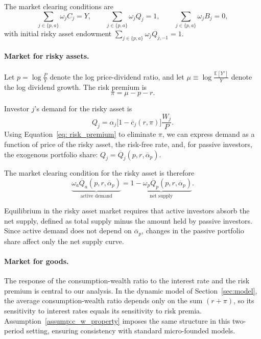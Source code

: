 The market clearing conditions are
\[
    \sum_{j\in\{p,a\}} \omega_j C_j = Y, \qquad
    \sum_{j\in\{p,a\}} \omega_j Q_j = 1, \qquad
    \sum_{j\in\{p,a\}} \omega_j B_j = 0,
\]
with initial risky asset endowment $\sum_{j\in\{p,a\}} \omega_j Q_{j,-1} = 1$.

\paragraph{Market for risky assets.}
Let $p = \log \frac{P}{Y}$ denote the log price-dividend ratio, and let $\mu \equiv \log \frac{\mathbb{E}[Y']}{Y}$ denote the log dividend growth.
The risk premium is
\begin{equation}\label{eq: risk_premium}
    \pi = \mu - p - r.
\end{equation}

Investor $j$'s demand for the risky asset is
\[
    Q_j = \alpha_j \bigl[1 - \overline{c}_{j}(r,\pi)\bigr] \frac{W_j}{P}.
\]
Using Equation~\eqref{eq: risk_premium} to eliminate $\pi$, we can express demand as a function of price of the risky asset, the risk-free rate, and, for passive investors, the exogenous portfolio share:
$
    Q_j = \overline{Q}_j(p, r, \overline{\alpha}_p).
$

The market clearing condition for the risky asset is therefore
\begin{equation}\label{eq:risky_mkt}
    \underbrace{\omega_a \overline{Q}_a(p, r, \overline{\alpha}_p)}_{\text{active demand}} 
    = \underbrace{1 - \omega_p \overline{Q}_p(p, r, \overline{\alpha}_p)}_{\text{net supply}}.
\end{equation}

Equilibrium in the risky asset market requires that active investors absorb the net supply, defined as total supply minus the amount held by passive investors.
Since active demand does not depend on $\overline{\alpha}_p$, changes in the passive portfolio share affect only the net supply curve.

\paragraph{Market for goods.}
The response of the consumption-wealth ratio to the interest rate and the risk premium is central to our analysis.
In the dynamic model of Section~\ref{sec:model}, the average consumption-wealth ratio depends only on the sum $(r+\pi)$, so its sensitivity to interest rates equals its sensitivity to risk premia.
Assumption~\ref{assump:c_w_property} imposes the same structure in this two-period setting, ensuring consistency with standard micro-founded models.

